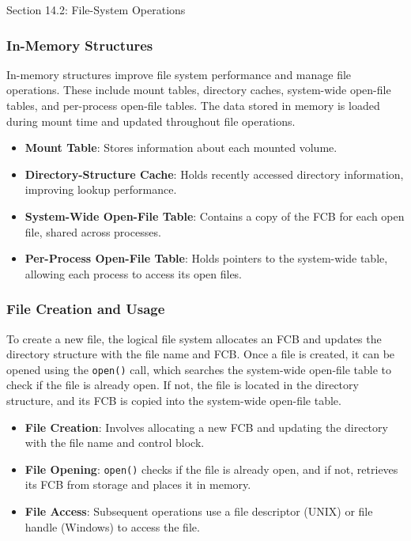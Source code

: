 \begin{notes}{Section 14.2: File-System Operations}
    \subsubsection*{In-Memory Structures}
    
    In-memory structures improve file system performance and manage file operations. These include mount tables, directory caches, system-wide open-file tables, and per-process open-file tables. The data stored in memory is loaded during mount time and updated throughout file operations.
    
    \begin{highlight}
    
        \begin{itemize}
            \item \textbf{Mount Table}: Stores information about each mounted volume.
            \item \textbf{Directory-Structure Cache}: Holds recently accessed directory information, improving lookup performance.
            \item \textbf{System-Wide Open-File Table}: Contains a copy of the FCB for each open file, shared across processes.
            \item \textbf{Per-Process Open-File Table}: Holds pointers to the system-wide table, allowing each process to access its open files.
        \end{itemize}
    
    \end{highlight}
    
    \subsubsection*{File Creation and Usage}
    
    To create a new file, the logical file system allocates an FCB and updates the directory structure with the file name and FCB. Once a file is created, it can be opened using the \texttt{open()} call, which searches the system-wide open-file table to check if the file is already open. If not, the file is located in the directory structure, and its FCB is copied into the system-wide open-file table.
    
    \begin{highlight}
    
        \begin{itemize}
            \item \textbf{File Creation}: Involves allocating a new FCB and updating the directory with the file name and control block.
            \item \textbf{File Opening}: \texttt{open()} checks if the file is already open, and if not, retrieves its FCB from storage and places it in memory.
            \item \textbf{File Access}: Subsequent operations use a file descriptor (UNIX) or file handle (Windows) to access the file.
        \end{itemize}
    

\end{highlight}
\end{notes}
